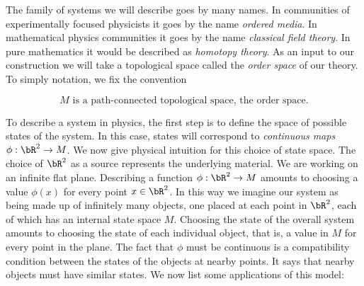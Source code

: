 The family of systems we will describe goes by many names. In communities of experimentally focused physicists it goes by the name {\em ordered media}. In mathematical physics communities it goes by the name {\em classical field theory}. In pure mathematics it would be described as {\em homotopy theory}. As an input to our construction we will take a topological space called the {\em order space} of our theory. To simply notation, we fix the convention

$$M\text{ is a path-connected topological space, the order space.}$$

To describe a system in physics, the first step is to define the space of possible states of the system. In this case, states will correspond to {\em continuous maps $\phi: \bR^2\to M$}. We now give physical intuition for this choice of state space. The choice of $\bR^2$ as a source represents the underlying material. We are working on an infinite flat plane. Describing a function $\phi: \bR^2\to M$ amounts to choosing a value $\phi(x)$ for every point $x\in \bR^2$. In this way we imagine our system as being made up of infinitely many objects, one placed at each point in $\bR^2$, each of which has an internal state space $M$. Choosing the state of the overall system amounts to choosing the state of each individual object, that is, a value in $M$ for every point in the plane. The fact that $\phi$ must be continuous is a compatibility condition between the states of the objects at nearby points. It says that nearby objects must have similar states. We now list some applications of this model:

